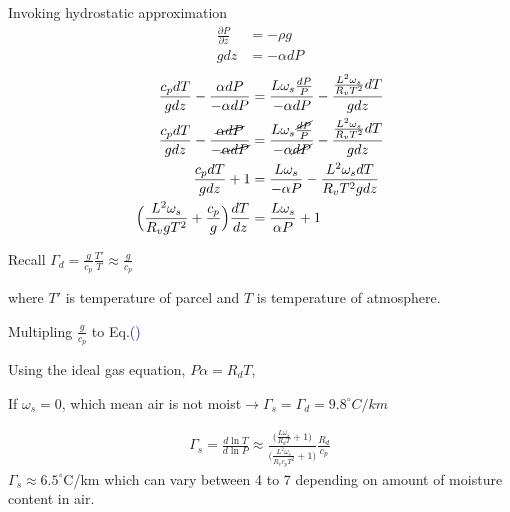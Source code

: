 \documentclass[fleqn,10pt]{SelfArx} %
\newcommand{\myeqref}[1]{\textcolor{blue}{\textup{(\getrefnumber{#1})}}}
\begin{document}
Invoking hydrostatic approximation
\begin{align}
    \frac{\partial P}{\partial z} &= -\rho g \\
    gdz &= -\alpha dP
\end{align}
\begin{align}
    \frac{c_pdT}{gdz} - \frac{\alpha dP}{-\alpha dP} &= \frac{L\omega_s \frac{dP}{P}}{-\alpha dP} - \frac{\frac{L^2\omega_s}{R_vT^2}dT}{gdz} \\
    \frac{c_pdT}{gdz} - \frac{\cancel{\alpha dP}}{-\cancel{\alpha dP}} &= \frac{L\omega_s \frac{\cancel{dP}}{P}}{-\alpha \cancel{dP}} - \frac{\frac{L^2\omega_s}{R_vT^2}dT}{gdz} \\
    \frac{c_pdT}{gdz} + 1 &= \frac{L\omega_s}{-\alpha P} - \frac{L^2\omega_sdT}{R_v T^2 gdz}\\
    \Big(\frac{L^2\omega_s}{R_v g T^2} + \frac{c_p}{g}\Big)\frac{dT}{dz} &= \frac{L\omega_s}{\alpha P} +1 \label{eq:lapse-rate}
\end{align}

Recall $\Gamma_d=\frac{g}{c_p}\frac{T'}{T} \approx \frac{g}{c_p}$

where $T'$ is temperature of parcel and $T$ is temperature of atmosphere.

Multipling $\frac{g}{c_p}$ to Eq.\myeqref{eq:lapse-rate}

Using the ideal gas equation, \( P\alpha = R_d T \),


If $\omega_s=0$, which mean air is not moist$\rightarrow$$\Gamma_s=\Gamma_d=9.8^\circ C/km$

\begin{align}
    \Gamma_s = \frac{d\ln T}{d\ln P} \approx \frac{\Big(\frac{L\omega_s}{R_dT} + 1\Big)}{\Big(\frac{L^2\omega_s}{R_v c_p T^2} + 1\Big)}\frac{R_d}{c_p}
\end{align}
$\Gamma_s \approx 6.5^\circ$C/km which can vary between 4 to 7 depending on amount of moisture content in air.
\end{document}
